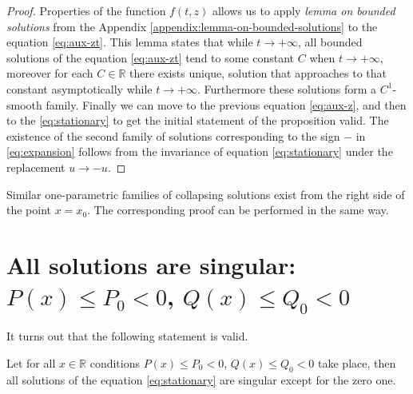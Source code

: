 \begin{proof}
	Properties of the function $f(t, z)$ allows us to apply {\it lemma on bounded solutions} from the Appendix \ref{appendix:lemma-on-bounded-solutions} to the equation \eqref{eq:aux-zt}.
	This lemma states that while $t \to +\infty$, all bounded solutions of the equation \eqref{eq:aux-zt} tend to some constant $C$ when $t \to +\infty$, moreover for each $C \in \mathbb{R}$ there exists unique, solution that approaches to that constant asymptotically while $t \to +\infty$.
	Furthermore these solutions form a $C^1$-smooth family.
	Finally we can move to the previous equation \eqref{eq:aux-z}, and then to the \eqref{eq:stationary} to get the initial statement of the proposition valid.
	The existence of the second family of solutions corresponding to the sign $-$ in \eqref{eq:expansion} follows from the invariance of equation \eqref{eq:stationary} under the replacement $u \to -u$.
\end{proof}

Similar one-parametric families of collapsing solutions exist from the right side of the point $x = x_0$.
The corresponding proof can be performed in the same way.

\section{All solutions are singular: $P(x) \le P_0 < 0$, $Q(x) \le Q_0 < 0$}

It turns out that the following statement is valid.
\begin{proposition}
	Let for all $x \in \mathbb{R}$ conditions $P(x) \le P_0 < 0$, $Q(x) \le Q_0 < 0$ take place, then all solutions of the equation \eqref{eq:stationary} are singular except for the zero one.
\end{proposition}

